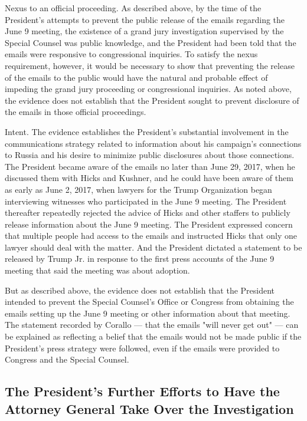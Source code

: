 Nexus to an official proceeding.
As described above, by the time of the President's attempts to prevent the public release of the emails regarding the June 9 meeting, the existence of a grand jury investigation supervised by the Special Counsel was public knowledge, and the President had been told that the emails were responsive to congressional inquiries.
To satisfy the nexus requirement, however, it would be necessary to show that preventing the release of the emails to the public would have the natural and probable effect of impeding the grand jury proceeding or congressional inquiries.
As noted above, the evidence does not establish that the President sought to prevent disclosure of the emails in those official proceedings.

Intent.
The evidence establishes the President's substantial involvement in the communications strategy related to information about his campaign's connections to Russia and his desire to minimize public disclosures about those connections.
The President became aware of the emails no later than June 29, 2017, when he discussed them with Hicks and Kushner, and he could have been aware of them as early as June 2, 2017, when lawyers for the Trump Organization began interviewing witnesses who participated in the June 9 meeting.
The President thereafter repeatedly rejected the advice of Hicks and other staffers to publicly release information about the June 9 meeting.
The President expressed concern that multiple people had access to the emails and instructed Hicks that only one lawyer should deal with the matter.
And the President dictated a statement to be released by Trump Jr. in response to the first press accounts of the June 9 meeting that said the meeting was about adoption.

But as described above, the evidence does not establish that the President intended to prevent the Special Counsel's Office or Congress from obtaining the emails setting up the June 9 meeting or other information about that meeting.
The statement recorded by Corallo — that the emails "will never get out" — can be explained as reflecting a belief that the emails would not be made public if the President's press strategy were followed, even if the emails were provided to Congress and the Special Counsel.

\subsection{The President's Further Efforts to Have the Attorney General Take Over the Investigation}

